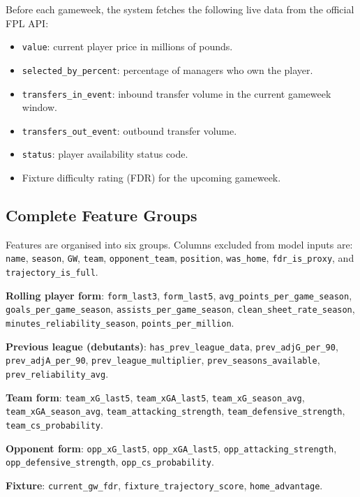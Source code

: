Before each gameweek, the system fetches the following live data from the official FPL API:
\begin{itemize}
  \item \texttt{value}: current player price in millions of pounds.
  \item \texttt{selected\_by\_percent}: percentage of managers who own the player.
  \item \texttt{transfers\_in\_event}: inbound transfer volume in the current gameweek window.
  \item \texttt{transfers\_out\_event}: outbound transfer volume.
  \item \texttt{status}: player availability status code.
  \item Fixture difficulty rating (FDR) for the upcoming gameweek.
\end{itemize}

\subsection{Complete Feature Groups}

Features are organised into six groups. Columns excluded from model inputs are: \texttt{name}, \texttt{season}, \texttt{GW}, \texttt{team}, \texttt{opponent\_team}, \texttt{position}, \texttt{was\_home}, \texttt{fdr\_is\_proxy}, and \texttt{trajectory\_is\_full}.

\textbf{Rolling player form}: \texttt{form\_last3}, \texttt{form\_last5}, \texttt{avg\_points\_per\_game\_season}, \texttt{goals\_per\_game\_season}, \texttt{assists\_per\_game\_season}, \texttt{clean\_sheet\_rate\_season}, \texttt{minutes\_reliability\_season}, \texttt{points\_per\_million}.

\textbf{Previous league (debutants)}: \texttt{has\_prev\_league\_data}, \texttt{prev\_adjG\_per\_90}, \texttt{prev\_adjA\_per\_90}, \texttt{prev\_league\_multiplier}, \texttt{prev\_seasons\_available}, \texttt{prev\_reliability\_avg}.

\textbf{Team form}: \texttt{team\_xG\_last5}, \texttt{team\_xGA\_last5}, \texttt{team\_xG\_season\_avg}, \texttt{team\_xGA\_season\_avg}, \texttt{team\_attacking\_strength}, \texttt{team\_defensive\_strength}, \texttt{team\_cs\_probability}.

\textbf{Opponent form}: \texttt{opp\_xG\_last5}, \texttt{opp\_xGA\_last5}, \texttt{opp\_attacking\_strength}, \texttt{opp\_defensive\_strength}, \texttt{opp\_cs\_probability}.

\textbf{Fixture}: \texttt{current\_gw\_fdr}, \texttt{fixture\_trajectory\_score}, \texttt{home\_advantage}.

